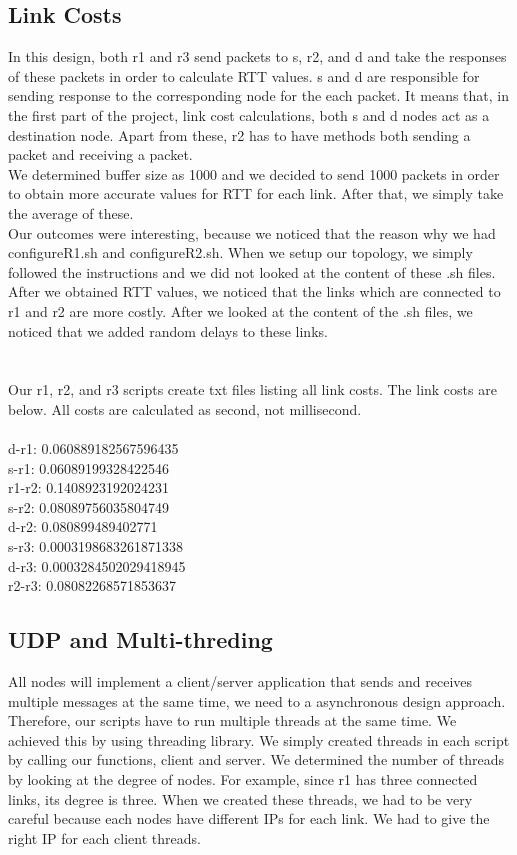 \documentclass[conference]{IEEEtran}
\begin{document}
\subsection{Link Costs}
In this design, both r1 and r3 send packets to s, r2, and d and take the responses of these packets in order to calculate RTT values. s and d are responsible for sending response to the corresponding node for the each packet. It means that, in the first part of the project, link cost calculations, both s and d nodes act as a destination node. Apart from these, r2 has to have methods both sending a packet and receiving a packet. \\

We determined buffer size as 1000 and we decided to send 1000 packets in order to obtain more accurate values for RTT for each link. After that, we simply take the average of these. \\

Our outcomes were interesting, because we noticed that the reason why we had configureR1.sh and configureR2.sh. When we setup our topology, we simply followed the instructions and we did not looked at the content of these .sh files. After we obtained RTT values, we noticed that the links which are connected to r1 and r2 are more costly. After we looked at the content of the .sh files, we noticed that we added random delays to these links. \\ \\ \\

Our r1, r2, and r3 scripts create txt files listing all link costs. The link costs are below. All costs are calculated as second, not millisecond. \\ \\
d-r1: 0.060889182567596435 \\
s-r1: 0.06089199328422546 \\
r1-r2: 0.1408923192024231 \\
s-r2: 0.08089756035804749 \\
d-r2: 0.080899489402771 \\
s-r3: 0.0003198683261871338 \\
d-r3: 0.0003284502029418945 \\
r2-r3: 0.08082268571853637 \\

\subsection{UDP and Multi-threding}
All nodes will implement a client/server application that sends and receives multiple messages at the same time, we need to a asynchronous design approach. Therefore, our scripts have to run multiple threads at the same time. We achieved this by using threading library. We simply created threads in each script by calling our functions, client and server. We determined the number of threads by looking at the degree of nodes. For example, since r1 has three connected links, its degree is three. When we created these threads, we had to be very careful because each nodes have different IPs for each link. We had to give the right IP for each client threads. \\
\end{document}

